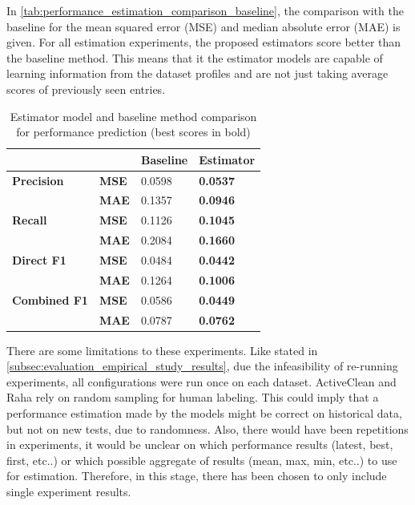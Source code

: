 In \autoref{tab:performance_estimation_comparison_baseline}, the comparison with the baseline for the mean squared error (MSE) and median absolute error (MAE) is given. For all estimation experiments, the proposed estimators score better than the baseline method. This means that it the estimator models are capable of learning information from the dataset profiles and are not just taking average scores of previously seen entries.

\begin{table}[h]
\centering
\begin{tabular}{ll|l|l}
                     &              & \textbf{Baseline} & \textbf{Estimator} \\ \hline
\textbf{Precision}   & \textbf{MSE} & 0.0598            & \textbf{0.0537}       \\ \hline
\textbf{}            & \textbf{MAE} & 0.1357            & \textbf{0.0946}       \\ \hline
\textbf{Recall}      & \textbf{MSE} & 0.1126            & \textbf{0.1045}       \\ \hline
\textbf{}            & \textbf{MAE} & 0.2084            & \textbf{0.1660}       \\ \hline
\textbf{Direct F1}   & \textbf{MSE} & 0.0484            & \textbf{0.0442}       \\ \hline
\textbf{}            & \textbf{MAE} & 0.1264            & \textbf{0.1006}       \\ \hline
\textbf{Combined F1} & \textbf{MSE} & 0.0586            & \textbf{0.0449}       \\ \hline
\textbf{}            & \textbf{MAE} & 0.0787            & \textbf{0.0762}      
\end{tabular}
\caption{Estimator model and baseline method comparison for performance prediction (best scores in bold)}
\label{tab:performance_estimation_comparison_baseline}
\end{table}

There are some limitations to these experiments. Like stated in \autoref{subsec:evaluation_empirical_study_results}, due the infeasibility of re-running experiments, all configurations were run once on each dataset. ActiveClean and Raha rely on random sampling for human labeling. This could imply that a performance estimation made by the models might be correct on historical data, but not on new tests, due to randomness. Also, there would have been repetitions in experiments, it would be unclear on which performance results (latest, best, first, etc..) or which possible aggregate of results (mean, max, min, etc..) to use for estimation. Therefore, in this stage, there has been chosen to only include single experiment results.

